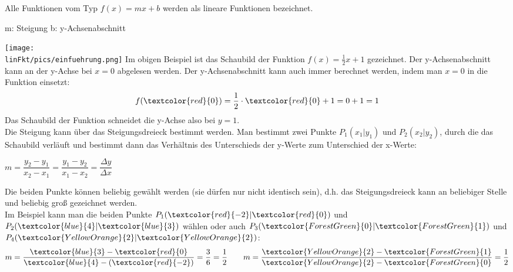 
Alle Funktionen vom Typ $f(x)=mx+b$ werden als lineare Funktionen bezeichnet.
\begin{tcolorbox}
	\centering\textcolor{loestc}{m: Steigung \qquad	b: y-Achsenabschnitt}
\end{tcolorbox}
\texttt{[image: \\linFkt/pics/einfuehrung.png]}
Im obigen Beispiel ist das Schaubild der Funktion $f(x)=\frac{1}{2}x+1$ gezeichnet. Der y-Achsenabschnitt kann an der y-Achse bei $x=0$ abgelesen werden. Der y-Achsenabschnitt kann auch immer berechnet werden, indem man $x=0$ in die Funktion einsetzt:
\begin{align*}
	f(\textcolor{red}{0})=\frac{1}{2}\cdot \textcolor{red}{0}+1=0+1=1
\end{align*}
Das Schaubild der Funktion schneidet die y-Achse also bei $y=1$.\\
Die Steigung kann über das Steigungsdreieck bestimmt werden. Man bestimmt zwei Punkte $P_1(x_1|y_1)$ und $P_2(x_2|y_2)$, durch die das Schaubild verläuft und bestimmt dann das Verhältnis des Unterschieds der y-Werte zum Unterschied der x-Werte:
\begin{tcolorbox}
	\centering\textcolor{loestc}{$m=\dfrac{y_2-y_1}{x_2-x_1}=\dfrac{y_1-y_2}{x_1-x_2}=\dfrac{\Delta y}{\Delta x}$}
\end{tcolorbox}
Die beiden Punkte können beliebig gewählt werden (sie dürfen nur nicht identisch sein), d.h. das Steigungsdreieck kann an beliebiger Stelle und beliebig groß gezeichnet werden.\\
Im Beispiel kann man die beiden Punkte $P_1(\textcolor{red}{-2}|\textcolor{red}{0})$ und $P_2(\textcolor{blue}{4}|\textcolor{blue}{3})$ wählen oder auch $P_3(\textcolor{ForestGreen}{0}|\textcolor{ForestGreen}{1})$ und $P_4(\textcolor{YellowOrange}{2}|\textcolor{YellowOrange}{2})$:
\begin{align*}
	m=\dfrac{\textcolor{blue}{3}-\textcolor{red}{0}}{\textcolor{blue}{4}-(\textcolor{red}{-2})}=\dfrac{3}{6}=\dfrac{1}{2}
	\qquad
	m=\dfrac{\textcolor{YellowOrange}{2}-\textcolor{ForestGreen}{1}}{\textcolor{YellowOrange}{2}-\textcolor{ForestGreen}{0}}=\dfrac{1}{2}
\end{align*}
\newpage
